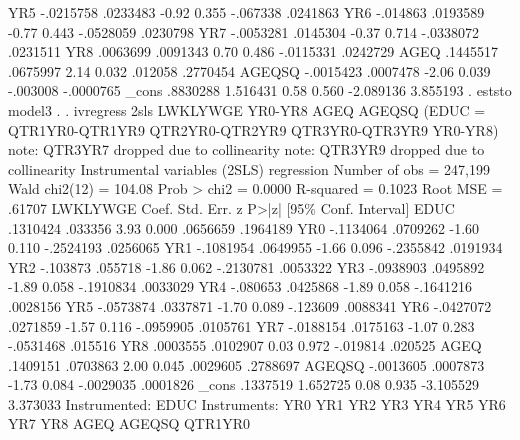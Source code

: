         YR5 {\VBAR}  -.0215758   .0233483    -0.92   0.355     -.067338    .0241863
         YR6 {\VBAR}   -.014863   .0193589    -0.77   0.443    -.0528059    .0230798
         YR7 {\VBAR}  -.0053281   .0145304    -0.37   0.714    -.0338072    .0231511
         YR8 {\VBAR}   .0063699   .0091343     0.70   0.486    -.0115331    .0242729
        AGEQ {\VBAR}   .1445517   .0675997     2.14   0.032      .012058    .2770454
      AGEQSQ {\VBAR}  -.0015423   .0007478    -2.06   0.039     -.003008   -.0000765
       _cons {\VBAR}   .8830288   1.516431     0.58   0.560    -2.089136    3.855193
{\smallskip}
. eststo model3
{\smallskip}
. 
. ivregress 2sls LWKLYWGE YR0-YR8 AGEQ AGEQSQ (EDUC = QTR1YR0-QTR1YR9 QTR2YR0-QTR2YR9 QTR3YR0-QTR3YR9 YR0-YR8)
note: QTR3YR7 dropped due to collinearity
note: QTR3YR9 dropped due to collinearity
{\smallskip}
Instrumental variables (2SLS) regression          Number of obs   =    247,199
                                                  Wald chi2(12)   =     104.08
                                                  Prob > chi2     =     0.0000
                                                  R-squared       =     0.1023
                                                  Root MSE        =     .61707
{\smallskip}
    LWKLYWGE {\VBAR}      Coef.   Std. Err.      z    P>|z|     [95\% Conf. Interval]
        EDUC {\VBAR}   .1310424    .033356     3.93   0.000     .0656659    .1964189
         YR0 {\VBAR}  -.1134064   .0709262    -1.60   0.110    -.2524193    .0256065
         YR1 {\VBAR}  -.1081954   .0649955    -1.66   0.096    -.2355842    .0191934
         YR2 {\VBAR}   -.103873    .055718    -1.86   0.062    -.2130781    .0053322
         YR3 {\VBAR}  -.0938903   .0495892    -1.89   0.058    -.1910834    .0033029
         YR4 {\VBAR}   -.080653   .0425868    -1.89   0.058    -.1641216    .0028156
         YR5 {\VBAR}  -.0573874   .0337871    -1.70   0.089     -.123609    .0088341
         YR6 {\VBAR}  -.0427072   .0271859    -1.57   0.116    -.0959905    .0105761
         YR7 {\VBAR}  -.0188154   .0175163    -1.07   0.283    -.0531468     .015516
         YR8 {\VBAR}   .0003555   .0102907     0.03   0.972     -.019814     .020525
        AGEQ {\VBAR}   .1409151   .0703863     2.00   0.045     .0029605    .2788697
      AGEQSQ {\VBAR}  -.0013605   .0007873    -1.73   0.084    -.0029035    .0001826
       _cons {\VBAR}   .1337519   1.652725     0.08   0.935    -3.105529    3.373033
Instrumented:  EDUC
Instruments:   YR0 YR1 YR2 YR3 YR4 YR5 YR6 YR7 YR8 AGEQ AGEQSQ QTR1YR0
